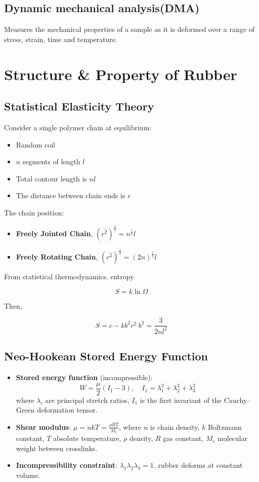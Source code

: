 \documentclass{NoteThesis/note-thesis}
\begin{document}

\subsection{Dynamic mechanical analysis(DMA)}

Measures the mechanical properties of a sample as it is deformed over a range of stress, strain, time and temperature.

\section{Structure \& Property of Rubber}

\subsection{Statistical Elasticity Theory}

Consider a single polymer chain at equilibrium:

\begin{itemize}
    \item Random coil
    \item $n$ segments of length $l$
    \item Total contour length is $nl$
    \item The distance between chain ends is $r$
\end{itemize}

The chain position:

\begin{itemize}
    \item \textbf{Freely Jointed Chain}, $(\bar{r^2})^{\frac{1}{2}}=n^{\frac{1}{2}}l$
    \item \textbf{Freely Rotating Chain}, $(\bar{r^2})^{\frac{1}{2}}=(2n)^{\frac{1}{2}}l$
\end{itemize}

From statistical thermodynamics, entropy

$$
S = k \ln \Omega
$$

Then,

$$
S=c-k b^2 r^2 \; b^2=\frac{3}{2nl^2}
$$

\subsection{Neo-Hookean Stored Energy Function}

\begin{itemize}
    \item \textbf{Stored energy function} (incompressible):
    $$
    W = \frac{\mu}{2}(I_1 - 3), \quad I_1 = \lambda_1^2 + \lambda_2^2 + \lambda_3^2
    $$
    where $\lambda_i$ are principal stretch ratios, $I_1$ is the first invariant of the Cauchy--Green deformation tensor.
    \item \textbf{Shear modulus}: $\mu = nkT = \frac{\rho RT}{M_c}$, where $n$ is chain density, $k$ Boltzmann constant, $T$ absolute temperature, $\rho$ density, $R$ gas constant, $M_c$ molecular weight between crosslinks.
    \item \textbf{Incompressibility constraint}: $\lambda_1\lambda_2\lambda_3 = 1$, rubber deforms at constant volume.
\end{itemize}
\end{document}

